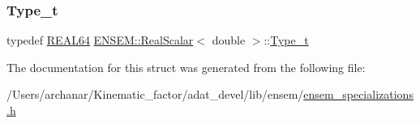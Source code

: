 \mbox{\label{structENSEM_1_1RealScalar_3_01double_01_4_a15549d5ed238882861151026df8e74b3}} 
\subsubsection{\texorpdfstring{Type\_t}{Type\_t}\hspace{0.1cm}{\footnotesize\ttfamily [2/2]}}
{\footnotesize\ttfamily typedef \mbox{\hyperlink{namespaceENSEM_a85b215b9f1f43715aebee01718e25082}{R\+E\+A\+L64}} \mbox{\hyperlink{structENSEM_1_1RealScalar}{E\+N\+S\+E\+M\+::\+Real\+Scalar}}$<$ double $>$\+::\mbox{\hyperlink{structENSEM_1_1RealScalar_3_01double_01_4_a15549d5ed238882861151026df8e74b3}{Type\+\_\+t}}}



The documentation for this struct was generated from the following file\+:\begin{DoxyCompactItemize}
\item 
/\+Users/archanar/\+Kinematic\+\_\+factor/adat\+\_\+devel/lib/ensem/\mbox{\hyperlink{lib_2ensem_2ensem__specializations_8h}{ensem\+\_\+specializations.\+h}}\end{DoxyCompactItemize}
